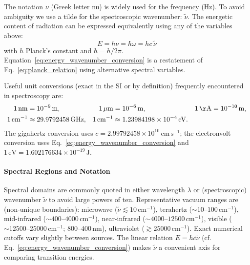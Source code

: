 \noindent The notation $\nu$ (Greek letter nu) is widely used for the frequency (Hz). To avoid ambiguity we use a tilde for the spectroscopic wavenumber: $\tilde{\nu}$. The energetic content of radiation can be expressed equivalently using any of the variables above:
\begin{equation}
    E = h\nu = \hbar\omega = h c \, \tilde{\nu}
    \label{eq:energy_wavenumber_conversion}
\end{equation}
with $h$ Planck's constant and $\hbar = h/2\pi$. Equation~\eqref{eq:energy_wavenumber_conversion} is a restatement of Eq.~\eqref{eq:planck_relation} using alternative spectral variables.

\noindent Useful unit conversions (exact in the SI or by definition) frequently encountered in spectroscopy are:
\begin{align}
    1\,\mathrm{nm}      & = 10^{-9}\,\mathrm{m},                        &
    1\,\mu\mathrm{m}    & = 10^{-6}\,\mathrm{m},                        &
    1\,\mathrm{\AA}     & = 10^{-10}\,\mathrm{m},                         \\
    1\,\mathrm{cm}^{-1} & \approx 29.9792458\,\mathrm{GHz},             &
    1\,\mathrm{cm}^{-1} & \approx 1.23984198\times10^{-4}\,\mathrm{eV}.
    \label{eq:unit_conversions}
\end{align}
The gigahertz conversion uses $c = 2.99792458\times10^{10}\,\mathrm{cm\,s^{-1}}$; the electronvolt conversion uses Eq.~\eqref{eq:energy_wavenumber_conversion} and $1\,\mathrm{eV} = 1.602176634\times10^{-19}\,\mathrm{J}$.

\paragraph{Spectral Regions and Notation}
\noindent Spectral domains are commonly quoted in either wavelength $\lambda$ or (spectroscopic) wavenumber $\tilde{\nu}$ to avoid large powers of ten. Representative vacuum ranges are (non-unique boundaries): microwave ($\tilde{\nu} \lesssim 10\,\mathrm{cm}^{-1}$), terahertz ($\sim 10$--$100\,\mathrm{cm}^{-1}$), mid-infrared ($\sim 400$--$4000\,\mathrm{cm}^{-1}$), near-infrared ($\sim 4000$--$12500\,\mathrm{cm}^{-1}$), visible ($\sim 12500$--$25000\,\mathrm{cm}^{-1}$; $800$--$400\,\mathrm{nm}$), ultraviolet ($\gtrsim 25000\,\mathrm{cm}^{-1}$). Exact numerical cutoffs vary slightly between sources. The linear relation $E = h c \tilde{\nu}$ (cf. Eq.~\eqref{eq:energy_wavenumber_conversion}) makes $\tilde{\nu}$ a convenient axis for comparing transition energies.

